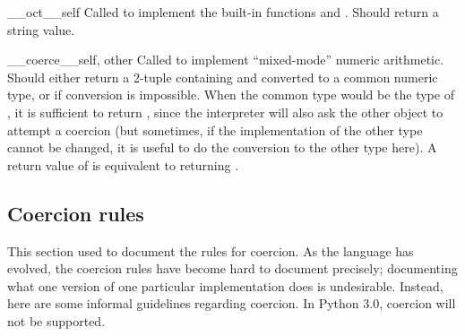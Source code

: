 \begin{methoddesc}{__oct__}{self}
Called to implement the built-in functions
 and
.  Should return a string value.
\end{methoddesc}

\begin{methoddesc}{__coerce__}{self, other}
Called to implement ``mixed-mode'' numeric arithmetic.  Should either
return a 2-tuple containing  and  converted to
a common numeric type, or  if conversion is impossible.  When
the common type would be the type of , it is sufficient to
return , since the interpreter will also ask the other
object to attempt a coercion (but sometimes, if the implementation of
the other type cannot be changed, it is useful to do the conversion to
the other type here).  A return value of  is
equivalent to returning .
\end{methoddesc}

\subsection{Coercion rules\label{coercion-rules}}

This section used to document the rules for coercion.  As the language
has evolved, the coercion rules have become hard to document
precisely; documenting what one version of one particular
implementation does is undesirable.  Instead, here are some informal
guidelines regarding coercion.  In Python 3.0, coercion will not be
supported.

